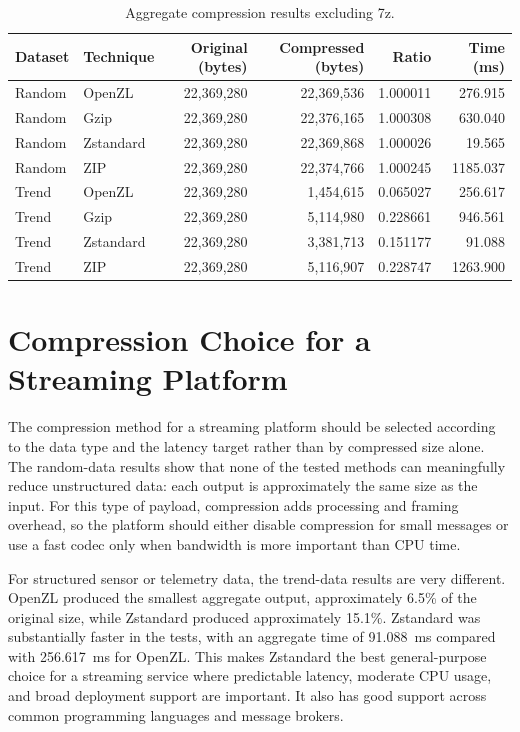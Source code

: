 \documentclass{article}
\begin{document}
\begin{table}[ht]
\centering
\caption{Aggregate compression results excluding 7z.}
\label{tab:compression-summary}
\begin{tabular}{llrrrr}
\hline
Dataset & Technique & Original (bytes) & Compressed (bytes) & Ratio & Time (ms) \\
\hline
Random & OpenZL     & 22,369,280 & 22,369,536 & 1.000011 & 276.915 \\
Random & Gzip       & 22,369,280 & 22,376,165 & 1.000308 & 630.040 \\
Random & Zstandard  & 22,369,280 & 22,369,868 & 1.000026 & 19.565 \\
Random & ZIP        & 22,369,280 & 22,374,766 & 1.000245 & 1185.037 \\
\hline
Trend & OpenZL       & 22,369,280 & 1,454,615 & 0.065027 & 256.617 \\
Trend & Gzip         & 22,369,280 & 5,114,980 & 0.228661 & 946.561 \\
Trend & Zstandard    & 22,369,280 & 3,381,713 & 0.151177 & 91.088 \\
Trend & ZIP          & 22,369,280 & 5,116,907 & 0.228747 & 1263.900 \\
\hline
\end{tabular}
\end{table}

\section{Compression Choice for a Streaming Platform}

The compression method for a streaming platform should be selected according to
the data type and the latency target rather than by compressed size alone.  The
random-data results show that none of the tested methods can meaningfully reduce
unstructured data: each output is approximately the same size as the input.
For this type of payload, compression adds processing and framing overhead, so
the platform should either disable compression for small messages or use a fast
codec only when bandwidth is more important than CPU time.

For structured sensor or telemetry data, the trend-data results are very
different.  OpenZL produced the smallest aggregate output, approximately
6.5\% of the original size, while Zstandard produced approximately 15.1\%.
Zstandard was substantially faster in the tests, with an aggregate time of
91.088~ms compared with 256.617~ms for OpenZL.  This makes Zstandard the best
general-purpose choice for a streaming service where predictable latency,
moderate CPU usage, and broad deployment support are important.  It also has
good support across common programming languages and message brokers.
\end{document}
